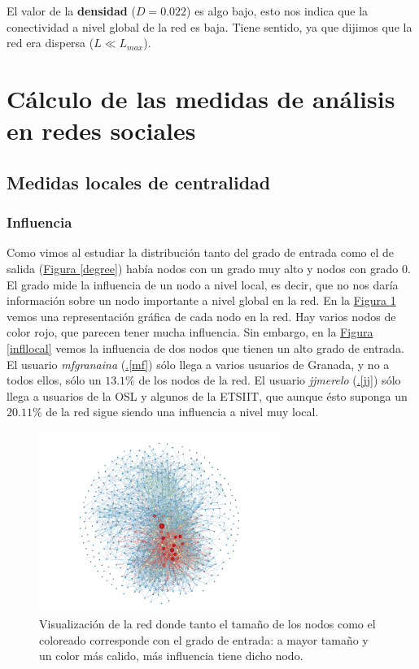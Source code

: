 \documentclass[10pt,a4paper,spanish]{article}
\numberwithin{equation}{section} %
\numberwithin{figure}{section} %
\numberwithin{table}{section} %
\begin{document}
El valor de la \textbf{densidad} ($D = 0.022$) es algo bajo, esto nos indica que la conectividad a nivel global de la red es baja. Tiene sentido, ya que dijimos que la red era dispersa ($L \ll L_{max}$).

\section{Cálculo de las medidas de análisis en redes sociales}

\subsection{Medidas locales de centralidad}

\subsubsection{Influencia}
Como vimos al estudiar la distribución tanto del grado de entrada como el de salida (\hyperref[degree]{Figura \ref*{degree}}) había nodos con un grado muy alto y nodos con grado 0. El grado mide la influencia de un nodo a nivel local, es decir, que no nos daría información sobre un nodo importante a nivel global en la red. En la \hyperref[influencia]{Figura \ref*{influencia}} vemos una representación gráfica de cada nodo en la red. Hay varios nodos de color rojo, que parecen tener mucha influencia. Sin embargo, en la \hyperref[infllocal]{Figura \ref*{infllocal}} vemos la influencia de dos nodos que tienen un alto grado de entrada. El usuario \textit{mfgranaina} (\hyperref[mf]{\thesection .\ref*{mf}}) sólo llega a varios usuarios de Granada, y no a todos ellos, sólo un $13.1\%$ de los nodos de la red. El usuario \textit{jjmerelo} (\hyperref[jj]{\thesection .\ref*{jj}}) sólo llega a usuarios de la OSL y algunos de la ETSIIT, que aunque ésto suponga un $20.11\%$ de la red sigue siendo una influencia a nivel muy local.

\begin{figure}[!h]
    \centering
    \includegraphics[width=0.7\textwidth]{medidas_locales/influencia}
    \caption{Visualización de la red donde tanto el tamaño de los nodos como el coloreado corresponde con el grado de entrada: a mayor tamaño y un color más calido, más influencia tiene dicho nodo.}
    \label{influencia}
\end{figure}
\end{document}
